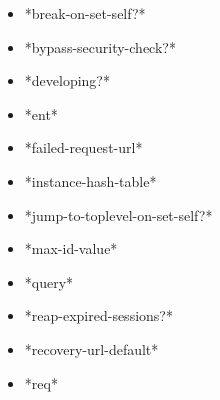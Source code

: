 \documentclass [11pt]{book}
\begin{document}
\begin{itemize}

\item {}*break-on-set-self?*





\item {}*bypass-security-check?*





\item {}*developing?*





\item {}*ent*





\item {}*failed-request-url*





\item {}*instance-hash-table*





\item {}*jump-to-toplevel-on-set-self?*





\item {}*max-id-value*





\item {}*query*





\item {}*reap-expired-sessions?*





\item {}*recovery-url-default*





\item {}*req*





\end{itemize}
\end{document}
